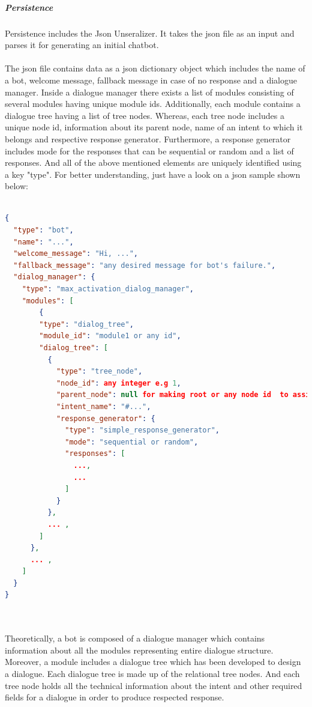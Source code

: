 \subparagraph*{Persistence}
Persistence includes the Json Unseralizer. It takes the json file as an input and parses it for generating an initial chatbot.
\\~\\
The json file contains data as a json dictionary object which includes the name of a bot, welcome message, fallback message in case of no response and a dialogue manager. Inside a dialogue manager there exists a list of modules consisting of several modules having unique module ids. Additionally, each module contains a dialogue tree having a list of tree nodes. Whereas, each tree node includes a unique node id, information about its parent node, name of an intent to which it belongs and respective response generator. Furthermore, a response generator includes mode for the responses that can be sequential or random and a list of responses. And all of the above mentioned elements are uniquely identified using a key "type". For better understanding, just have a look on a json sample shown below:
\\~\\
\begin{lstlisting}[language=json, firstnumber=1, label={lst:botJson}]
{
  "type": "bot",
  "name": "...",
  "welcome_message": "Hi, ...",
  "fallback_message": "any desired message for bot's failure.",
  "dialog_manager": {
    "type": "max_activation_dialog_manager",
    "modules": [
        {
        "type": "dialog_tree",
        "module_id": "module1 or any id",
        "dialog_tree": [
          {
            "type": "tree_node",
            "node_id": any integer e.g 1,
            "parent_node": null for making root or any node id  to assign it a parent,
            "intent_name": "#...",
            "response_generator": {
              "type": "simple_response_generator",
              "mode": "sequential or random",
              "responses": [
                ...,
                ...
              ]
            }
          },
          ... ,
        ]
      },
      ... ,
    ]
  }
}
\end{lstlisting}
\\~\\
Theoretically, a bot is composed of a dialogue manager which contains information about all the modules representing entire dialogue structure. Moreover, a module includes a dialogue tree which has been developed to design a dialogue. Each dialogue tree is made up of the relational tree nodes. And each tree node holds all the technical information about the intent and other required fields for a dialogue in order to produce respected response.

